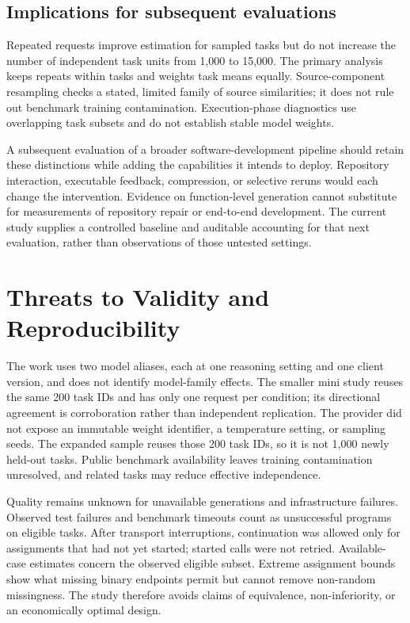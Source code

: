 \subsection{Implications for subsequent evaluations}
Repeated requests improve estimation for sampled tasks but do not increase the number of independent task units from 1,000 to 15,000. The primary analysis keeps repeats within tasks and weights task means equally. Source-component resampling checks a stated, limited family of source similarities; it does not rule out benchmark training contamination. Execution-phase diagnostics use overlapping task subsets and do not establish stable model weights.

A subsequent evaluation of a broader software-development pipeline should retain these distinctions while adding the capabilities it intends to deploy. Repository interaction, executable feedback, compression, or selective reruns would each change the intervention. Evidence on function-level generation cannot substitute for measurements of repository repair or end-to-end development. The current study supplies a controlled baseline and auditable accounting for that next evaluation, rather than observations of those untested settings.

\section{Threats to Validity and Reproducibility}
The work uses two model aliases, each at one reasoning setting and one client version, and does not identify model-family effects. The smaller mini study reuses the same 200 task IDs and has only one request per condition; its directional agreement is corroboration rather than independent replication. The provider did not expose an immutable weight identifier, a temperature setting, or sampling seeds. The expanded sample reuses those 200 task IDs, so it is not 1,000 newly held-out tasks. Public benchmark availability leaves training contamination unresolved, and related tasks may reduce effective independence.

Quality remains unknown for unavailable generations and infrastructure failures. Observed test failures and benchmark timeouts count as unsuccessful programs on eligible tasks. After transport interruptions, continuation was allowed only for assignments that had not yet started; started calls were not retried. Available-case estimates concern the observed eligible subset. Extreme assignment bounds show what missing binary endpoints permit but cannot remove non-random missingness. The study therefore avoids claims of equivalence, non-inferiority, or an economically optimal design.

